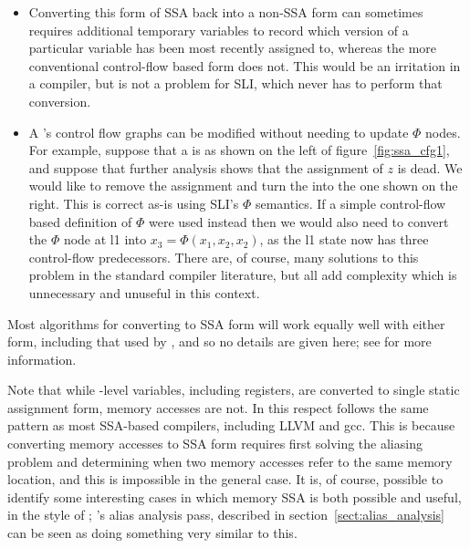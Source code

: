 \begin{itemize}
\item
  Converting this form of SSA back into a non-SSA form can sometimes
  requires additional temporary variables to record which version of a
  particular variable has been most recently assigned to, whereas the
  more conventional control-flow based form does not.  This would be
  an irritation in a compiler, but is not a problem for SLI, which
  never has to perform that conversion.
\item
  A {\StateMachine}'s control flow graphs can be modified without
  needing to update $\Phi$ nodes.  For example, suppose that a
  \StateMachine is as shown on the left of figure~\ref{fig:ssa_cfg1},
  and suppose that further analysis shows that the assignment of $z$
  is dead.  We would like to remove the assignment and turn the
  \StateMachine into the one shown on the right.  This is correct
  as-is using SLI's $\Phi$ semantics.  If a simple control-flow based
  definition of $\Phi$ were used instead then we would also need to
  convert the $\Phi$ node at l1 into $x_3 = \Phi(x_1, x_2, x_2)$, as
  the l1 state now has three control-flow predecessors.  There are, of
  course, many solutions to this problem in the standard compiler
  literature\needCite{}, but all add complexity which is unnecessary
  and unuseful in this context.
\end{itemize}

Most algorithms for converting to SSA form will work equally well with
either form, including that used by \implementation, and so no details
are given here; see \needCite{} for more information.


Note that while {\StateMachine}-level variables, including registers,
are converted to single static assignment form, memory accesses are
not.  In this respect {\technique} follows the same pattern as most
SSA-based compilers, including LLVM\needCite{} and gcc.  This is
because converting memory accesses to SSA form requires first solving
the aliasing problem and determining when two memory accesses refer to
the same memory location, and this is impossible in the general case.
It is, of course, possible to identify some interesting cases in which
memory SSA is both possible and useful, in the style of
; {\technique}'s alias analysis pass,
described in section~\ref{sect:alias_analysis} can be seen as doing
something very similar to this.

